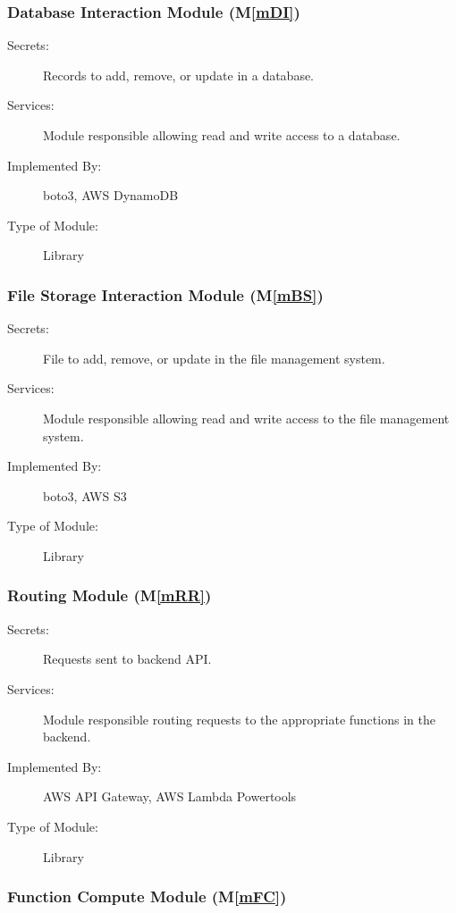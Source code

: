 \documentclass[12pt, titlepage]{article}
\newcommand{\mref}[1]{M\ref{#1}}
\begin{document}
\subsubsection{Database Interaction Module (\mref{mDI})}

\begin{description}
  \item[Secrets:] Records to add, remove, or update in a database.
  \item[Services:] Module responsible allowing read and write access
    to a database.
  \item[Implemented By:] boto3, AWS DynamoDB
  \item[Type of Module:] Library
\end{description}

\subsubsection{File Storage Interaction Module (\mref{mBS})}

\begin{description}
  \item[Secrets:] File to add, remove, or update in the file management system.
  \item[Services:] Module responsible allowing read and write access
    to the file management system.
  \item[Implemented By:] boto3, AWS S3
  \item[Type of Module:] Library
\end{description}

\subsubsection{Routing Module (\mref{mRR})}

\begin{description}
  \item[Secrets:] Requests sent to backend API.
  \item[Services:] Module responsible routing requests to the
    appropriate functions in the backend.
  \item[Implemented By:] AWS API Gateway, AWS Lambda Powertools
  \item[Type of Module:] Library
\end{description}

\subsubsection{Function Compute Module (\mref{mFC})}
\end{document}

